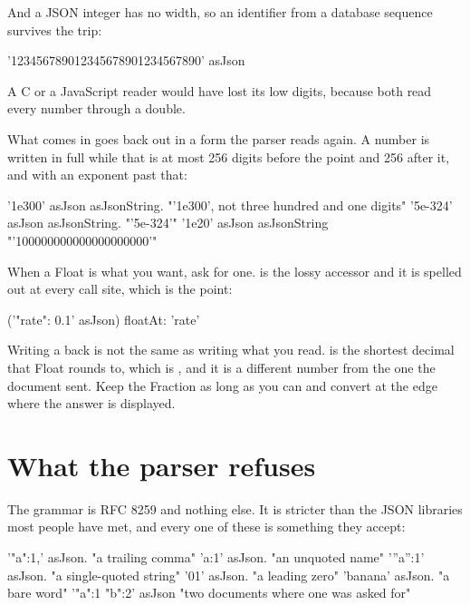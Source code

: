 And a JSON integer has no width, so an identifier from a database sequence
survives the trip:

\begin{st}
'123456789012345678901234567890' asJson
\end{st}

A C or a JavaScript reader would have lost its low digits, because both read
every number through a double.

What comes in goes back out in a form the parser reads again. A number is
written in full while that is at most 256 digits before the point and 256
after it, and with an exponent past that:

\begin{st}
'1e300' asJson asJsonString.        "'1e300', not three hundred and one digits"
'5e-324' asJson asJsonString.       "'5e-324'"
'1e20' asJson asJsonString          "'100000000000000000000'"
\end{st}

When a Float is what you want, ask for one.  is the lossy
accessor and it is spelled out at every call site, which is the point:

\begin{st}
('{"rate": 0.1}' asJson) floatAt: 'rate'
\end{st}

\begin{stwarn}
Writing a  back is not the same as writing what you read.
 is the shortest decimal that Float rounds to, which is
, and it is a different number from the one the document sent. Keep
the Fraction as long as you can and convert at the edge where the answer is
displayed.
\end{stwarn}

\section{What the parser refuses}

The grammar is RFC 8259 and nothing else. It is stricter than the JSON
libraries most people have met, and every one of these is something they
accept:

\begin{st}
'{"a":1,}' asJson.      "a trailing comma"
'{a:1}' asJson.         "an unquoted name"
'{''a'':1}' asJson.     "a single-quoted string"
'01' asJson.            "a leading zero"
'banana' asJson.        "a bare word"
'{"a":1} {"b":2}' asJson  "two documents where one was asked for"
\end{st}

